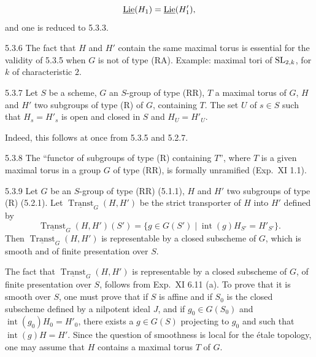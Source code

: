 \[
\underline{\operatorname{Lie}}(H_1)=\underline{\operatorname{Lie}}(H'_1),
\]
and one is reduced to 5.3.3.
\begin{remark}{5.3.6}\label{XXII.5.3.6}
The fact that $H$ and $H'$ contain the same maximal torus is essential for the validity of 5.3.5 when $G$ is not of type (RA). Example: maximal tori of $\operatorname{SL}_{2,k}$, for $k$ of characteristic $2$.{\renewcommand{\thefootnote}{(33)}}
\end{remark}
\begin{corollary}{5.3.7}\label{XXII.5.3.7}
Let $S$ be a scheme, $G$ an $S$-group of type (RR), $T$ a maximal torus of $G$, $H$ and $H'$ two subgroups of type (R) of $G$, containing $T$. The set $U$ of $s\in S$ such that $H_s=H'_s$ is open and closed in $S$ and $H_U=H'_U$.
\end{corollary}
Indeed, this follows at once from 5.3.5 and 5.2.7.
\begin{corollary}{5.3.8}\label{XXII.5.3.8}
The ``functor of subgroups of type (R) containing $T$'', where $T$ is a given maximal torus in a group $G$ of type (RR), is formally unramified (Exp.~XI 1.1).
\end{corollary}
\begin{theorem}{5.3.9}\label{XXII.5.3.9}
Let $G$ be an $S$-group of type (RR) (5.1.1), $H$ and $H'$ two subgroups of type (R) (5.2.1). Let $\underline{\operatorname{Transt}}_G(H,H')$ be the strict transporter of $H$ into $H'$ defined by
\[
\underline{\operatorname{Transt}}_G(H,H')(S')=\{g\in G(S')\mid\operatorname{int}(g)H_{S'}=H'_{S'}\}.
\]
Then $\underline{\operatorname{Transt}}_G(H,H')$ is representable by a closed subscheme of $G$, which is smooth and of finite presentation over $S$.
\end{theorem}
The fact that $\underline{\operatorname{Transt}}_G(H,H')$ is representable by a closed subscheme of $G$, of finite presentation over $S$, follows from Exp.~XI 6.11 (a). To prove that it is smooth over $S$, one must prove that if $S$ is affine and if $S_0$ is the closed subscheme defined by a nilpotent ideal $J$, and if $g_0\in G(S_0)$ and $\operatorname{int}(g_0)H_0=H'_0$, there exists a $g\in G(S)$ projecting to $g_0$ and such that $\operatorname{int}(g)H=H'$. Since the question of smoothness is local for the \'etale topology, one may assume that $H$ contains a maximal torus $T$ of $G$.

